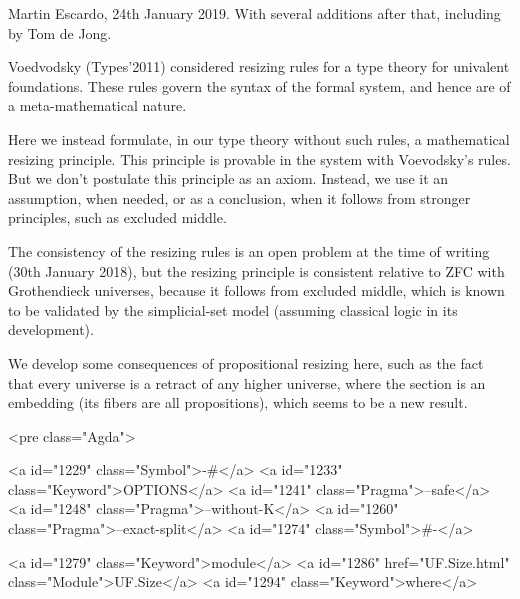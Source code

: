 Martin Escardo, 24th January 2019.
With several additions after that, including by Tom de Jong.

Voedvodsky (Types'2011) considered resizing rules for a type theory
for univalent foundations. These rules govern the syntax of the formal
system, and hence are of a meta-mathematical nature.

Here we instead formulate, in our type theory without such rules, a
mathematical resizing principle. This principle is provable in the
system with Voevodsky's rules. But we don't postulate this principle
as an axiom. Instead, we use it an assumption, when needed, or as a
conclusion, when it follows from stronger principles, such as excluded
middle.

The consistency of the resizing rules is an open problem at the time
of writing (30th January 2018), but the resizing principle is
consistent relative to ZFC with Grothendieck universes, because it
follows from excluded middle, which is known to be validated by the
simplicial-set model (assuming classical logic in its development).

We develop some consequences of propositional resizing here, such as
the fact that every universe is a retract of any higher universe,
where the section is an embedding (its fibers are all propositions),
which seems to be a new result.

<pre class="Agda">

<a id="1229" class="Symbol">{-#</a> <a id="1233" class="Keyword">OPTIONS</a> <a id="1241" class="Pragma">--safe</a> <a id="1248" class="Pragma">--without-K</a> <a id="1260" class="Pragma">--exact-split</a> <a id="1274" class="Symbol">#-}</a>

<a id="1279" class="Keyword">module</a> <a id="1286" href="UF.Size.html" class="Module">UF.Size</a> <a id="1294" class="Keyword">where</a>

